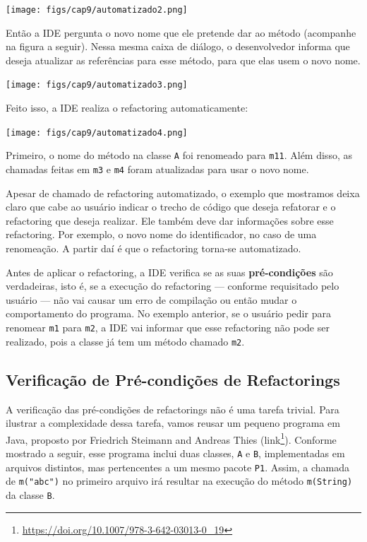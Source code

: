 \documentclass[
  11pt,
  twoside]{book}
\newcommand{\passthrough}[1]{#1}
\DeclareRobustCommand{\href}[2]{#2\footnote{\url{#1}}}
\begin{document}
\texttt{[image: figs/cap9/automatizado2.png]}

Então a IDE pergunta o novo nome que ele pretende dar ao método
(acompanhe na figura a seguir). Nessa mesma caixa de diálogo, o
desenvolvedor informa que deseja atualizar as referências para esse
método, para que elas usem o novo nome.

\texttt{[image: figs/cap9/automatizado3.png]}

Feito isso, a IDE realiza o refactoring automaticamente:

\texttt{[image: figs/cap9/automatizado4.png]}

Primeiro, o nome do método na classe \passthrough{\lstinline!A!} foi
renomeado para \passthrough{\lstinline!m11!}. Além disso, as chamadas
feitas em \passthrough{\lstinline!m3!} e \passthrough{\lstinline!m4!}
foram atualizadas para usar o novo nome.

Apesar de chamado de refactoring automatizado, o exemplo que mostramos
deixa claro que cabe ao usuário indicar o trecho de código que deseja
refatorar e o refactoring que deseja realizar. Ele também deve dar
informações sobre esse refactoring. Por exemplo, o novo nome do
identificador, no caso de uma renomeação. A partir daí é que o
refactoring torna-se automatizado.

 Antes de aplicar o refactoring, a IDE
verifica se as suas \textbf{pré-condições} são verdadeiras, isto é, se a
execução do refactoring --- conforme requisitado pelo usuário --- não
vai causar um erro de compilação ou então mudar o comportamento do
programa. No exemplo anterior, se o usuário pedir para renomear
\passthrough{\lstinline!m1!} para \passthrough{\lstinline!m2!}, a IDE
vai informar que esse refactoring não pode ser realizado, pois a classe
já tem um método chamado \passthrough{\lstinline!m2!}.

\hypertarget{verificauxe7uxe3o-de-pruxe9-condiuxe7uxf5es-de-refactorings}{%
\subsection{Verificação de Pré-condições de
Refactorings}\label{verificauxe7uxe3o-de-pruxe9-condiuxe7uxf5es-de-refactorings}}

A verificação das pré-condições de refactorings não é uma tarefa
trivial. Para ilustrar a complexidade dessa tarefa, vamos reusar um
pequeno programa em Java, proposto por Friedrich Steimann and Andreas
Thies (\href{https://doi.org/10.1007/978-3-642-03013-0_19}{link}).
Conforme mostrado a seguir, esse programa inclui duas classes,
\passthrough{\lstinline!A!} e \passthrough{\lstinline!B!}, implementadas
em arquivos distintos, mas pertencentes a um mesmo pacote
\passthrough{\lstinline!P1!}. Assim, a chamada de
\passthrough{\lstinline!m("abc")!} no primeiro arquivo irá resultar na
execução do método \passthrough{\lstinline!m(String)!} da classe
\passthrough{\lstinline!B!}.
\end{document}
